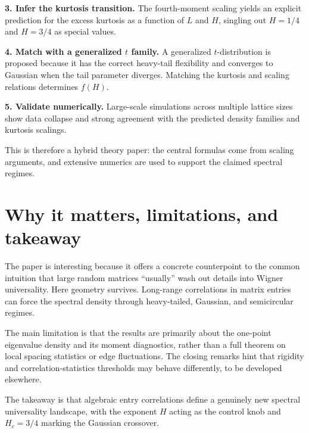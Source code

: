 \documentclass[11pt]{article}
\begin{document}
\textbf{3. Infer the kurtosis transition.} The fourth-moment scaling yields an explicit prediction for the excess kurtosis as a function of $L$ and $H$, singling out $H=1/4$ and $H=3/4$ as special values.

\textbf{4. Match with a generalized $t$ family.} A generalized $t$-distribution is proposed because it has the correct heavy-tail flexibility and converges to Gaussian when the tail parameter diverges. Matching the kurtosis and scaling relations determines $f(H)$.

\textbf{5. Validate numerically.} Large-scale simulations across multiple lattice sizes show data collapse and strong agreement with the predicted density families and kurtosis scalings.

This is therefore a hybrid theory paper: the central formulas come from scaling arguments, and extensive numerics are used to support the claimed spectral regimes.

\section*{Why it matters, limitations, and takeaway}
The paper is interesting because it offers a concrete counterpoint to the common intuition that large random matrices ``usually'' wash out details into Wigner universality. Here geometry survives. Long-range correlations in matrix entries can force the spectral density through heavy-tailed, Gaussian, and semicircular regimes.

The main limitation is that the results are primarily about the one-point eigenvalue density and its moment diagnostics, rather than a full theorem on local spacing statistics or edge fluctuations. The closing remarks hint that rigidity and correlation-statistics thresholds may behave differently, to be developed elsewhere.

The takeaway is that algebraic entry correlations define a genuinely new spectral universality landscape, with the exponent $H$ acting as the control knob and $H_c=3/4$ marking the Gaussian crossover.
\end{document}
